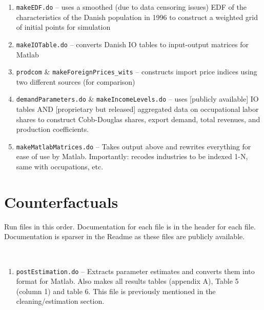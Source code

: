 \documentclass[11pt]{article}
\begin{document}
\begin{enumerate}
	\item \verb!makeEDF.do! -- uses a smoothed (due to data censoring issues) EDF of the characteristics of the Danish population in 1996	to construct a weighted grid of initial points for simulation
	\item \verb!makeIOTable.do! -- converts Danish IO tables to input-output matrices for Matlab
	\item \verb!prodcom! \& \verb!makeForeignPrices_wits! -- constructs import price indices using two different sources (for comparison)
	\item \verb!demandParameters.do! \& \verb!makeIncomeLevels.do! -- uses [publicly available] IO tables AND [proprietary but released] aggregated data on occupational labor shares to construct Cobb-Douglas shares, export demand, total revenues, and production coefficients.
	\item \verb!makeMatlabMatrices.do! -- Takes output above and rewrites everything for ease of use by Matlab. Importantly: recodes industries to be indexed 1-N, same with occupations, etc.
\end{enumerate}


\section*{Counterfactuals}
Run files in this order. Documentation for each file is in the header for each file. Documentation is sparser in the Readme as these files are publicly available. 

\\
\begin{enumerate}
	\item \verb!postEstimation.do! -- Extracts parameter estimates and converts them into format for Matlab. Also makes all results tables (appendix A), Table 5 (column 1) and table 6. This file is previously mentioned in the cleaning/estimation section.
\end{enumerate}
\end{document}
